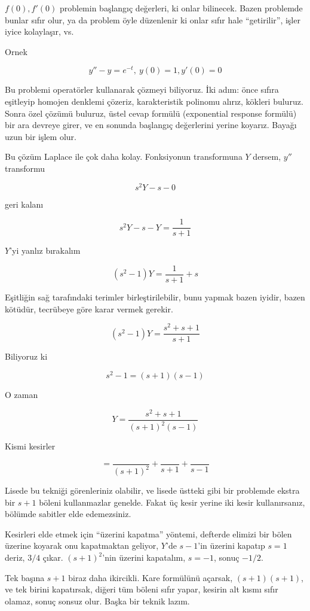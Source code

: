 \documentclass[12pt,fleqn]{article}\usepackage{../../common}
\begin{document}
$f(0),f'(0)$ problemin başlangıç değerleri, ki onlar bilinecek. Bazen
problemde bunlar sıfır olur, ya da problem öyle düzenlenir ki onlar sıfır
hale ``getirilir'', işler iyice kolaylaşır, vs.

Ornek

$$ y'' - y = e^{-t}, \ y(0) = 1, y'(0)=0 $$

Bu problemi operatörler kullanarak çözmeyi biliyoruz. İki adım: önce sıfıra
eşitleyip homojen denklemi çözeriz, karakteristik polinomu alırız, kökleri
buluruz. Sonra özel çözümü buluruz, üstel cevap formülü (exponential
response formülü) bir ara devreye girer, ve en sonunda başlangıç
değerlerini yerine koyarız. Bayağı uzun bir işlem olur. 

Bu çözüm Laplace ile çok daha kolay. Fonksiyonun transformuna $Y$ dersem,
$y''$ transformu

$$ s^2Y - s - 0$$

geri kalanı

$$ s^2Y - s - Y = \frac{1}{s+1}$$

$Y$'yi yanlız bırakalım

$$ (s^2-1)Y = \frac{1}{s+1} + s $$

Eşitliğin sağ tarafındaki terimler birleştirilebilir, bunu yapmak bazen
iyidir, bazen kötüdür, tecrübeye göre karar vermek gerekir. 

$$ (s^2-1)Y = \frac{s^2+s+1}{s+1} $$

Biliyoruz ki

$$ s^2-1 = (s+1)(s-1) $$

O zaman 

$$ Y = \frac{s^2+s+1}{(s+1)^2(s-1)} $$

Kismi kesirler 

$$ = \frac{}{(s+1)^2} + \frac{}{s+1} + \frac{}{s-1} $$

Lisede bu tekniği görenleriniz olabilir, ve lisede üstteki gibi bir
problemde ekstra bir $s+1$ böleni kullanmazlar genelde. Fakat üç kesir
yerine iki kesir kullanırsanız, bölümde sabitler elde edemezsiniz. 

Kesirleri elde etmek için ``üzerini kapatma'' yöntemi, defterde elimizi bir
bölen üzerine koyarak onu kapatmaktan geliyor, $Y$'de  $s-1$'in
üzerini kapatıp $s=1$ deriz, $3/4$ çıkar. $(s+1)^2$'nin üzerini kapatalım,
$s=-1$, sonuç $-1/2$. 

Tek başına $s+1$ biraz daha ikircikli. Kare formülünü açarsak,
$(s+1)(s+1)$, ve tek birini kapatırsak, diğeri tüm böleni sıfır yapar,
kesirin alt kısmı sıfır olamaz, sonuç sonsuz olur. Başka bir teknik lazım. 
\end{document}
